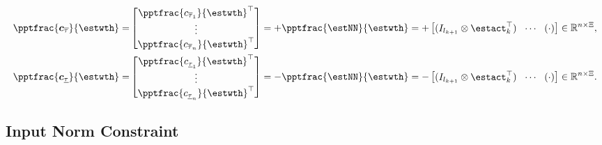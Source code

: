 \documentclass[final,5p,times,twocolumn,authoryear]{elsarticle}
\begin{document}
\begin{equation}
    \begin{aligned}
        \pptfrac{\boldsymbol c_{\overline \tau}}{\estwth}
        =& 
        \begin{bmatrix}
            \pptfrac{c_{\overline \tau_1}}{\estwth}^\top \\
            \vdots \\
            \pptfrac{c_{\overline \tau_n}}{\estwth}^\top
        \end{bmatrix}
        = 
            +\pptfrac{\estNN}{\estwth}
        =
        +
        \begin{bmatrix}
            (I_{l_{k+1}}\otimes \estact_{k}^\top)&
            \!\cdots\! &
            (
                \cdot
            )
        \end{bmatrix} 
        \in
        \mathbb R^{n\times \Xi}
        , 
        \\
        \pptfrac{\boldsymbol c_{\underline\tau}}{\estwth}         
        =
        & 
        \begin{bmatrix}
            \pptfrac{c_{\underline\tau_1}}{\estwth}^\top \\
            \vdots \\
            \pptfrac{c_{\underline\tau_n}}{\estwth}^\top
        \end{bmatrix}
        = 
        -\pptfrac{\estNN}{\estwth}
        =
        -\begin{bmatrix}
            (I_{l_{k+1}}\otimes \estact_{k}^\top)&
            \!\cdots\! &
            (
                \cdot
            )
        \end{bmatrix} 
        \in
        \mathbb R^{n\times \Xi}
        .
    \end{aligned}
    \label{eq:cstr:input:bound:grad}
\end{equation}

\subsection{Input Norm Constraint}\label{sec:appen:cstr:input:norm}
\end{document}
